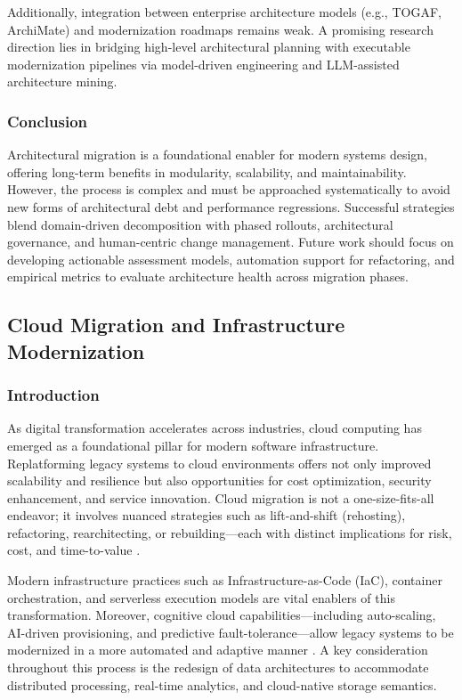 \documentclass[12pt]{article}
\begin{document}
Additionally, integration between enterprise architecture models (e.g., TOGAF, ArchiMate) and modernization roadmaps remains weak. A promising research direction lies in bridging high-level architectural planning with executable modernization pipelines via model-driven engineering and LLM-assisted architecture mining.



\subsubsection{Conclusion}

Architectural migration is a foundational enabler for modern systems design, offering long-term benefits in modularity, scalability, and maintainability. However, the process is complex and must be approached systematically to avoid new forms of architectural debt and performance regressions. Successful strategies blend domain-driven decomposition with phased rollouts, architectural governance, and human-centric change management. Future work should focus on developing actionable assessment models, automation support for refactoring, and empirical metrics to evaluate architecture health across migration phases.

\subsection{Cloud Migration and Infrastructure Modernization}

\subsubsection{Introduction}

As digital transformation accelerates across industries, cloud computing has emerged as a foundational pillar for modern software infrastructure. Replatforming legacy systems to cloud environments offers not only improved scalability and resilience but also opportunities for cost optimization, security enhancement, and service innovation. Cloud migration is not a one-size-fits-all endeavor; it involves nuanced strategies such as lift-and-shift (rehosting), refactoring, rearchitecting, or rebuilding—each with distinct implications for risk, cost, and time-to-value \cite{hasan2023}.

Modern infrastructure practices such as Infrastructure-as-Code (IaC), container orchestration, and serverless execution models are vital enablers of this transformation. Moreover, cognitive cloud capabilities—including auto-scaling, AI-driven provisioning, and predictive fault-tolerance—allow legacy systems to be modernized in a more automated and adaptive manner \cite{fahmideh2019, yousef2024}. A key consideration throughout this process is the redesign of data architectures to accommodate distributed processing, real-time analytics, and cloud-native storage semantics.
\end{document}
